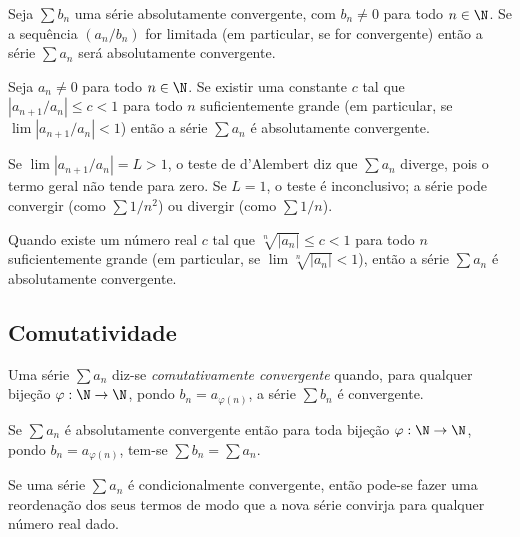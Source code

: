 \documentclass{article}
\begin{document}
\begin{prop}
    Seja \(\sum b_n\) uma série absolutamente convergente, com \(b_n \neq 0\) para todo \(n \in \N\). Se a sequência \((a_n/b_n)\) for limitada (em particular, se for convergente) então a série \(\sum a_n\) será absolutamente convergente.
\end{prop}

\begin{cor} 
    Seja \(a_n \neq 0\) para todo \(n \in \N\). Se existir uma constante \(c\) tal que \(|a_{n+1}/a_n| \leq c < 1\) para todo \(n\) suficientemente grande (em particular, se \(\lim |a_{n+1}/a_n| < 1\)) então a série \(\sum a_n\) é absolutamente convergente.
\end{cor}

\begin{rem}
    Se \(\lim |a_{n+1}/a_n| = L > 1\), o teste de d'Alembert diz que \(\sum a_n\) diverge, pois o termo geral não tende para zero. Se \(L = 1\), o teste é inconclusivo; a série pode convergir (como \(\sum 1/n^2\)) ou divergir (como \(\sum 1/n\)).
\end{rem}

\begin{thm} 
    Quando existe um número real \(c\) tal que \(\sqrt[n]{|a_n|} \leq c < 1\) para todo \(n\) suficientemente grande (em particular, se \(\lim \sqrt[n]{|a_n|} < 1\)), então a série \(\sum a_n\) é absolutamente convergente.
\end{thm}

\subsection{Comutatividade}

\begin{defn}
    Uma série \(\sum a_n\) diz-se \emph{comutativamente convergente} quando, para qualquer bijeção \(\varphi: \N \to \N\), pondo \(b_n = a_{\varphi(n)}\), a série \(\sum b_n\) é convergente.
\end{defn}

\begin{prop}
    Se \(\sum a_n\) é absolutamente convergente então para toda bijeção \(\varphi: \N \to \N\), pondo \(b_n = a_{\varphi(n)}\), tem-se \(\sum b_n = \sum a_n\).
\end{prop}

\begin{thm} [Riemann]
    Se uma série \(\sum a_n\) é condicionalmente convergente, então pode-se fazer uma reordenação dos seus termos de modo que a nova série convirja para qualquer número real dado.
\end{thm}
\end{document}

